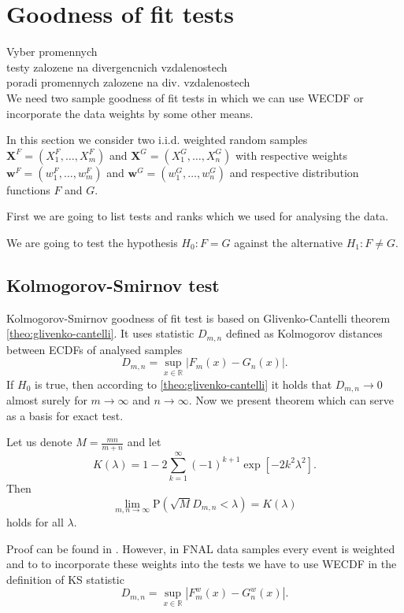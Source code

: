 \chapter{Goodness of fit tests}
\label{ch:GoF}

Vyber promennych \\
testy zalozene na divergencnich vzdalenostech \\
poradi promennych zalozene na div. vzdalenostech\\

We need two sample goodness of fit  tests in which we can use WECDF or incorporate the data weights by some other means.

In this section we consider two i.i.d. weighted random samples $\mathbf{X}^F = (X^F_1,\ldots, X^F_m)$ and $\mathbf{X}^G = (X^G_1, \ldots, X^G_n)$ with respective weights $\mathbf{w}^F = (w^F_1,\ldots, w^F_m)$ and $\mathbf{w}^G = (w^G_1,\ldots, w^G_n)$ and respective distribution functions $F$ and $G$.   

First we are going to list  tests and ranks which we used for analysing the data.

We are going to test the hypothesis $H_0: F = G$ against the alternative $H_1: F \neq G$. 
\section{Kolmogorov-Smirnov test}
Kolmogorov-Smirnov goodness of fit test is based on Glivenko-Cantelli theorem \ref{theo:glivenko-cantelli}. It uses statistic $D_{m,n}$ defined as Kolmogorov distances between ECDFs of analysed samples
\begin{equation}
D_{m,n} = \sup_{x \in \mathbb{R}} |F_m(x) - G_n(x)|.
\end{equation}
If $H_0$ is true, then according to \ref{theo:glivenko-cantelli} it holds that $D_{m,n} \rightarrow 0$ almost surely for $m \rightarrow \infty$ and $n \rightarrow \infty$. Now we present theorem which can serve as a basis for exact test.

\begin{theorem}[Smirnov]
	Let us denote $M = \frac{mn}{m+n}$ and let 
	\begin{equation}
	K(\lambda) = 1 - 2\sum_{k=1}^{\infty} (-1)^{k+1} \exp\left[ -2k^2\lambda^2\right].
	\end{equation}
	Then 
	\begin{equation}
	\lim_{m,n \rightarrow \infty} \mathrm{P}(\sqrt{M}D_{m,n} < \lambda) = K(\lambda)
	\end{equation}
	holds for all $\lambda$.
\end{theorem}
\noindent Proof can be found in \cite{Smirnov1944}. 
However, in FNAL data samples every event is weighted and to to incorporate these weights into the tests we have to use WECDF in the definition of KS statistic
\begin{equation}
D_{m,n} = \sup_{x \in \mathbb{R}} |F^w_m(x) - G^w_n(x)|.
\end{equation}

